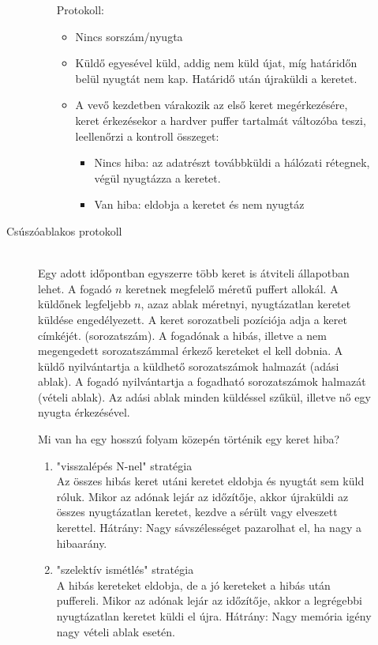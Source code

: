 \documentclass[margin=0px]{article}
\begin{document}
\begin{description}
\begin{description}
\begin{itemize}
							 	Protokoll:
							 	\begin{itemize}
							 		\item Nincs sorszám/nyugta
							 		\item Küldő egyesével küld, addig nem küld újat, míg határidőn belül nyugtát nem kap. Határidő után újraküldi a keretet.
							 		\item A vevő kezdetben várakozik az első keret megérkezésére, keret érkezésekor a hardver puffer tartalmát változóba teszi, leellenőrzi a kontroll összeget:
							 		\begin{itemize}
							 			\item Nincs hiba: az adatrészt továbbküldi a hálózati rétegnek, végül nyugtázza a keretet.
							 			\item Van hiba: eldobja a keretet és nem nyugtáz
							 		\end{itemize}
							 	\end{itemize}
						 \end{itemize}
					\item[Csúszóablakos protokoll] \hfill \\
						Egy adott időpontban egyszerre több keret is átviteli állapotban lehet. A fogadó $n$ keretnek megfelelő méretű puffert allokál. A küldőnek legfeljebb $n$, azaz ablak méretnyi, nyugtázatlan keretet küldése engedélyezett. A keret sorozatbeli pozíciója adja a keret címkéjét. (sorozatszám).
						A fogadónak a hibás, illetve a nem megengedett sorozatszámmal érkező kereteket el kell dobnia. A küldő nyilvántartja a küldhető sorozatszámok halmazát (adási ablak). A fogadó nyilvántartja a fogadható sorozatszámok halmazát (vételi ablak). Az adási ablak minden küldéssel szűkül, illetve nő egy nyugta érkezésével.
						
						Mi van ha egy hosszú folyam közepén történik egy keret hiba?
						\begin{enumerate}
							\item "visszalépés N-nel" stratégia\\
								Az összes hibás keret utáni keretet eldobja és nyugtát sem küld róluk. Mikor az adónak lejár az időzítője, akkor újraküldi az összes nyugtázatlan keretet, kezdve a sérült vagy elveszett kerettel. Hátrány: Nagy sávszélességet pazarolhat el, ha nagy a hibaarány.
							\item "szelektív ismétlés" stratégia \\
								A hibás kereteket eldobja, de a jó kereteket a hibás után puffereli. Mikor az adónak lejár az időzítője, akkor a legrégebbi nyugtázatlan keretet küldi el újra. Hátrány: Nagy memória igény nagy vételi ablak esetén.
						\end{enumerate}
						

\end{description}
\end{description}
\end{document}

